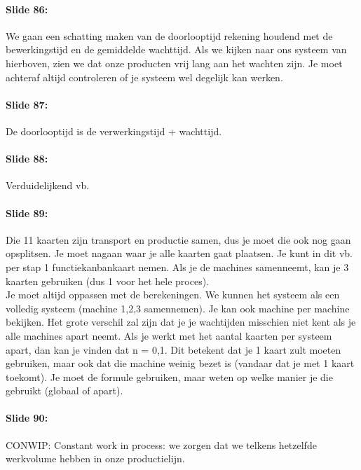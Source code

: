 \documentclass[10pt,a4paper]{report}
\begin{document}
\paragraph{Slide 86:} We gaan een schatting maken van de doorlooptijd rekening houdend met de bewerkingstijd en de gemiddelde wachttijd. Als we kijken naar ons systeem van hierboven, zien we dat onze producten vrij lang aan het wachten zijn. Je moet achteraf altijd controleren of je systeem wel degelijk kan werken. 

\paragraph{Slide 87:} De doorlooptijd is de verwerkingstijd + wachttijd.

\paragraph{Slide 88:} Verduidelijkend vb. 

\paragraph{Slide 89:} Die 11 kaarten zijn transport en productie samen, dus je moet die ook nog gaan opsplitsen. Je moet nagaan waar je alle kaarten gaat plaatsen. Je kunt in dit vb. per stap 1 functiekanbankaart nemen. Als je de machines samenneemt, kan je 3 kaarten gebruiken (dus 1 voor het hele proces).\\
Je moet altijd oppassen met de berekeningen. We kunnen het systeem als een volledig systeem (machine 1,2,3 samennemen). Je kan ook machine per machine bekijken. Het grote verschil zal zijn dat je je wachtijden misschien niet kent als je alle machines apart neemt. Als je werkt met het aantal kaarten per systeem apart, dan kan je vinden dat n = 0,1. Dit betekent dat je 1 kaart zult moeten gebruiken, maar ook dat die machine weinig bezet is (vandaar dat je met 1 kaart toekomt). Je moet de formule gebruiken, maar weten op welke manier je die gebruikt (globaal of apart).

\paragraph{Slide 90:} CONWIP: Constant work in process: we zorgen dat we telkens hetzelfde werkvolume hebben in onze productielijn.
\end{document}
